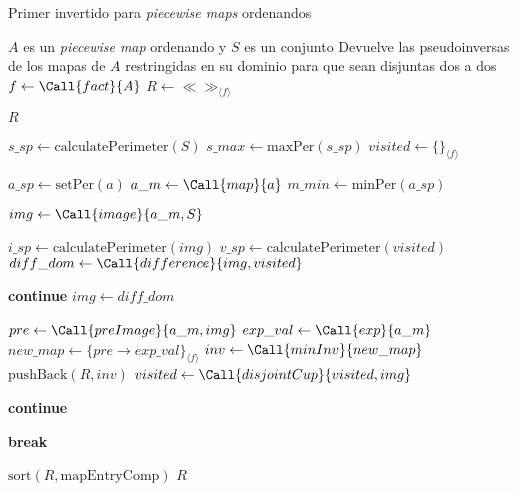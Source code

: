 \begin{algorithm}
\caption{Primer invertido para \textit{piecewise maps} ordenandos}
\label{alg:firstInv-ord}
\begin{algorithmic}[1]
\Require $A$ es un \textit{piecewise map} ordenando y $S$ es un conjunto
\Ensure Devuelve las pseudoinversas de los mapas de $A$ restringidas en su dominio para que sean disjuntas dos a dos
    \State $f \gets \Call{fact}{A}$
    \State $R \gets \ll\gg_{\langle f \rangle}$                 
    
        \State \Return $R$
    \EndIf

    \State $s\_sp \gets \mathrm{calculatePerimeter}(S)$
    \State $s\_max \gets \mathrm{maxPer}(s\_sp)$
    \State $visited \gets \{\}_{\langle f \rangle}$
    
        \State $a\_sp \gets \mathrm{setPer}(a)$ 
        \State $a\_m \gets \Call{map}{a}$
        \State $m\_min \gets \mathrm{minPer}(a\_sp)$
        
            \State $img \gets \Call{image}{a\_m, S}$
    
                
                
                    \State $i\_sp \gets \mathrm{calculatePerimeter}(img)$
                    \State $v\_sp \gets \mathrm{calculatePerimeter}(visited)$
                        \State $diff\_dom \gets \Call{difference}{img, visited}$
    
                            \State \textbf{continue}
                        \Else
                            \State $img \gets diff\_dom$
                        \EndIf
                    \Else
                    \EndIf
                \Else
                \EndIf

                \State $pre \gets \Call{preImage}{a\_m, img}$
                \State $exp\_val \gets \Call{exp}{a\_m}$
                \State $new\_map \gets \{pre \rightarrow exp\_val\}_{\langle f \rangle}$
                \State $inv \gets \Call{minInv}{new\_map}$
                \State $\mathrm{pushBack}(R,inv)$ 
                \State $visited \gets \Call{disjointCup}{visited, img}$
            \EndIf
            
            \State \textbf{continue} 
        \EndIf

        

            \State \textbf{break}    
        \EndIf
    \EndFor

    \State $ \mathrm{sort}(R,\mathrm{mapEntryComp})$
    \State \Return $R$
\EndFunction
\end{algorithmic}
\end{algorithm}



